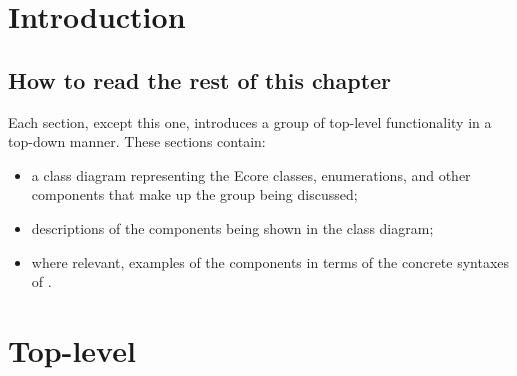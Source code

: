 

\section{Introduction}\label{ssec:core-metamodel-intro}
\subsection{How to read the rest of this chapter}\label{ssec:core-metamodel-intro-readme}

Each section, except this one,
introduces a group of top-level \langname{}
functionality in a top-down manner.  These sections contain:

\begin{itemize}
\item
	a class diagram representing the Ecore classes, enumerations, and other
	components that make up the group being discussed;
\item
	descriptions of the components being shown in the class diagram;
\item
	where relevant, examples of the components in terms of the concrete
	syntaxes of \langname.
\end{itemize}

\section{Top-level}\label{ssec:core-metamodel-top}


